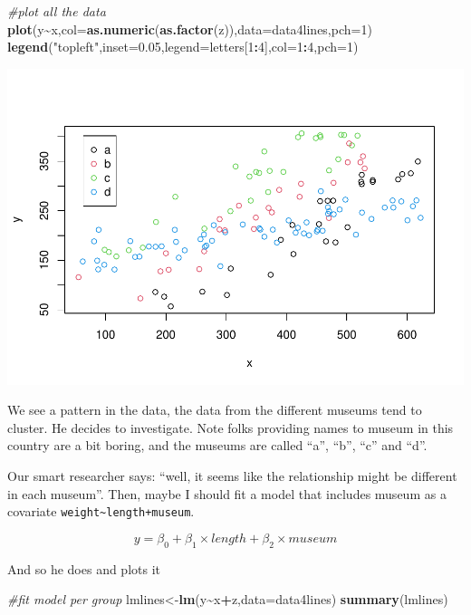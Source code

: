 \documentclass[
]{book}
\newenvironment{Shaded}{\begin{snugshade}}{\end{snugshade}}
\newcommand{\AttributeTok}[1]{\textcolor[rgb]{0.13,0.29,0.53}{#1}}
\newcommand{\CommentTok}[1]{\textcolor[rgb]{0.56,0.35,0.01}{\textit{#1}}}
\newcommand{\DecValTok}[1]{\textcolor[rgb]{0.00,0.00,0.81}{#1}}
\newcommand{\FloatTok}[1]{\textcolor[rgb]{0.00,0.00,0.81}{#1}}
\newcommand{\FunctionTok}[1]{\textcolor[rgb]{0.13,0.29,0.53}{\textbf{#1}}}
\newcommand{\NormalTok}[1]{#1}
\newcommand{\OtherTok}[1]{\textcolor[rgb]{0.56,0.35,0.01}{#1}}
\newcommand{\SpecialCharTok}[1]{\textcolor[rgb]{0.81,0.36,0.00}{\textbf{#1}}}
\newcommand{\StringTok}[1]{\textcolor[rgb]{0.31,0.60,0.02}{#1}}
\begin{document}
\begin{Shaded}
\begin{Highlighting}[]
\CommentTok{\#plot all the data}
\FunctionTok{plot}\NormalTok{(y}\SpecialCharTok{\textasciitilde{}}\NormalTok{x,}\AttributeTok{col=}\FunctionTok{as.numeric}\NormalTok{(}\FunctionTok{as.factor}\NormalTok{(z)),}\AttributeTok{data=}\NormalTok{data4lines,}\AttributeTok{pch=}\DecValTok{1}\NormalTok{)}
\FunctionTok{legend}\NormalTok{(}\StringTok{"topleft"}\NormalTok{,}\AttributeTok{inset=}\FloatTok{0.05}\NormalTok{,}\AttributeTok{legend=}\NormalTok{letters[}\DecValTok{1}\SpecialCharTok{:}\DecValTok{4}\NormalTok{],}\AttributeTok{col=}\DecValTok{1}\SpecialCharTok{:}\DecValTok{4}\NormalTok{,}\AttributeTok{pch=}\DecValTok{1}\NormalTok{)}
\end{Highlighting}
\end{Shaded}

\includegraphics{ECOMODbook_files/figure-latex/a7.11-1.pdf}

We see a pattern in the data, the data from the different museums tend to cluster. He decides to investigate. Note folks providing names to museum in this country are a bit boring, and the museums are called ``a'', ``b'', ``c'' and ``d''.

Our smart researcher says: ``well, it seems like the relationship might be different in each museum''. Then, maybe I should fit a model that includes museum as a covariate \texttt{weight\textasciitilde{}length+museum}.

\[y=\beta_0+\beta_1 \times length +\beta_2 \times museum\]

And so he does and plots it

\begin{Shaded}
\begin{Highlighting}[]
\CommentTok{\#fit model per group}
\NormalTok{lmlines}\OtherTok{\textless{}{-}}\FunctionTok{lm}\NormalTok{(y}\SpecialCharTok{\textasciitilde{}}\NormalTok{x}\SpecialCharTok{+}\NormalTok{z,}\AttributeTok{data=}\NormalTok{data4lines)}
\FunctionTok{summary}\NormalTok{(lmlines)}
\end{Highlighting}
\end{Shaded}
\end{document}
